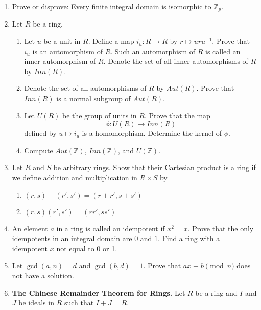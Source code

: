 {\begin{enumerate}
 
\item
Prove or disprove: Every finite integral domain is isomorphic to
${\mathbb Z}_p$. 
 
 
\item
Let $R$ be a ring.
\begin{enumerate}
 
 \item
Let $u$ be a unit in $R$.  Define a map $i_u : R \rightarrow R$ by $r
\mapsto uru^{-1}$. Prove that $i_u$ is an automorphism of $R$. Such an
automorphism of $R$ is called an inner automorphism of $R$. Denote the
set of all inner automorphisms of $R$ by $Inn(R)$.
 
 \item
Denote the set of all automorphisms of $R$ by $Aut(R)$. Prove that
$Inn(R)$ is a normal subgroup of  $Aut(R)$. 
 
 \item
Let $U(R)$ be the group of units in $R$. Prove that the map
\[
\phi : U(R) \rightarrow Inn(R)
\]
defined by $u \mapsto i_u$ is a homomorphism.  Determine the kernel of
$\phi$. 
 
 \item
Compute $Aut( {\mathbb Z})$, $Inn( {\mathbb Z})$,  and $U( {\mathbb Z})$. 
 
\end{enumerate}
 
 
\item
Let $R$ and $S$ be arbitrary rings.  Show that their Cartesian product
is a ring if we define addition and multiplication in $R \times S$  by 
\begin{enumerate}
 
 \item
$(r, s) + (r', s') = ( r + r', s + s')$
 
 \item
$(r, s)(r', s') = ( rr', ss')$
 
\end{enumerate}
 
 
\item
An element $a$ in a ring is called an {\bfi
idempotent\/} if $x^2 = x$.
Prove that the only idempotents in an integral domain are $0$ and $1$. 
Find a ring with a idempotent $x$ not equal to 0 or 1.
 
\item
Let $\gcd(a, n) = d$ and $\gcd(b, d) = 1$.  Prove that $ax \equiv b
\pmod{n}$ does not have a solution.
 
\item
{\bf The Chinese Remainder Theorem for Rings.}
Let $R$ be a ring and $I$ and $J$ be ideals in $R$ such that $I+J =
R$. 
\begin{enumerate}
 

\end{enumerate}
\end{enumerate}}
